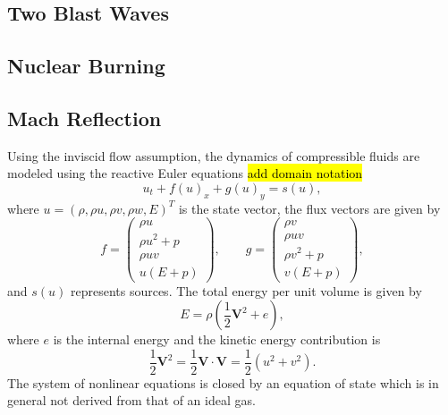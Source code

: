 \documentclass[12pt,letterpaper]{article}
\begin{document}
    \subsection*{Two Blast Waves}

    \subsection*{Nuclear Burning}

    \subsection*{Mach Reflection}
    Using the inviscid flow assumption, the dynamics of compressible fluids are
    modeled using the reactive Euler equations \hl{add domain notation}
    \begin{equation}
       u_{t} + f(u)_{x}
       + g(u)_{y} = s(u),
        \label{goveq}
    \end{equation}
    where $u = \left( \rho, \rho u, \rho v, \rho w, E \right)^{T}$ is
    the state vector, the flux vectors are given by
    \begin{equation}
        f = 
    \begin{pmatrix}
    \rho u \\ \rho u^2 + p \\ \rho u v \\ u( E + p )
    \end{pmatrix}, \text{ } \text{ } \text{ }
        g = 
    \begin{pmatrix}
    \rho v \\ \rho u v \\ \rho v^2 + p \\ v( E + p )
    \end{pmatrix},
    \end{equation}
    and $s(u)$ represents sources. The total energy per
    unit volume is given by
    \begin{equation*}
        E = \rho \left( \frac{1}{2} \mathbf{V}^{2} + e \right),
    \end{equation*}
    where $e$ is the internal energy and the kinetic energy contribution is
    \begin{equation*}
        \frac{1}{2} \mathbf{V}^{2} = \frac{1}{2} \mathbf{V}
        \cdot \mathbf{V} = \frac{1}{2} \left( u^2 + v^2 \right).
    \end{equation*}
    The system of nonlinear equations is closed by an
    equation of state which is in general not derived from that of an ideal gas.
\end{document}
